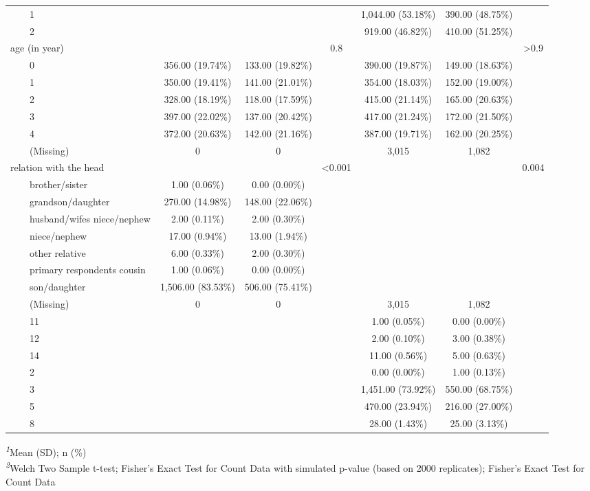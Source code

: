 \begin{longtable}{lcccccc}
    1 &  &  &  & 1,044.00 (53.18\%) & 390.00 (48.75\%) &  \\ 
    2 &  &  &  & 919.00 (46.82\%) & 410.00 (51.25\%) &  \\ 
age (in year) &  &  & 0.8 &  &  & >0.9 \\ 
    0 & 356.00 (19.74\%) & 133.00 (19.82\%) &  & 390.00 (19.87\%) & 149.00 (18.63\%) &  \\ 
    1 & 350.00 (19.41\%) & 141.00 (21.01\%) &  & 354.00 (18.03\%) & 152.00 (19.00\%) &  \\ 
    2 & 328.00 (18.19\%) & 118.00 (17.59\%) &  & 415.00 (21.14\%) & 165.00 (20.63\%) &  \\ 
    3 & 397.00 (22.02\%) & 137.00 (20.42\%) &  & 417.00 (21.24\%) & 172.00 (21.50\%) &  \\ 
    4 & 372.00 (20.63\%) & 142.00 (21.16\%) &  & 387.00 (19.71\%) & 162.00 (20.25\%) &  \\ 
    (Missing) & 0 & 0 &  & 3,015 & 1,082 &  \\ 
relation with the head &  &  & <0.001 &  &  & 0.004 \\ 
    brother/sister & 1.00 (0.06\%) & 0.00 (0.00\%) &  &  &  &  \\ 
    grandson/daughter & 270.00 (14.98\%) & 148.00 (22.06\%) &  &  &  &  \\ 
    husband/wifes  niece/nephew & 2.00 (0.11\%) & 2.00 (0.30\%) &  &  &  &  \\ 
    niece/nephew & 17.00 (0.94\%) & 13.00 (1.94\%) &  &  &  &  \\ 
    other relative & 6.00 (0.33\%) & 2.00 (0.30\%) &  &  &  &  \\ 
    primary respondents cousin & 1.00 (0.06\%) & 0.00 (0.00\%) &  &  &  &  \\ 
    son/daughter & 1,506.00 (83.53\%) & 506.00 (75.41\%) &  &  &  &  \\ 
    (Missing) & 0 & 0 &  & 3,015 & 1,082 &  \\ 
    11 &  &  &  & 1.00 (0.05\%) & 0.00 (0.00\%) &  \\ 
    12 &  &  &  & 2.00 (0.10\%) & 3.00 (0.38\%) &  \\ 
    14 &  &  &  & 11.00 (0.56\%) & 5.00 (0.63\%) &  \\ 
    2 &  &  &  & 0.00 (0.00\%) & 1.00 (0.13\%) &  \\ 
    3 &  &  &  & 1,451.00 (73.92\%) & 550.00 (68.75\%) &  \\ 
    5 &  &  &  & 470.00 (23.94\%) & 216.00 (27.00\%) &  \\ 
    8 &  &  &  & 28.00 (1.43\%) & 25.00 (3.13\%) &  \\ 
\bottomrule
\end{longtable}
\begin{minipage}{\linewidth}
\textsuperscript{\textit{1}}Mean (SD); n (\%)\\
\textsuperscript{\textit{2}}Welch Two Sample t-test; Fisher's Exact Test for Count Data with simulated p-value
(based on 2000 replicates); Fisher's Exact Test for Count Data\\
\end{minipage}

